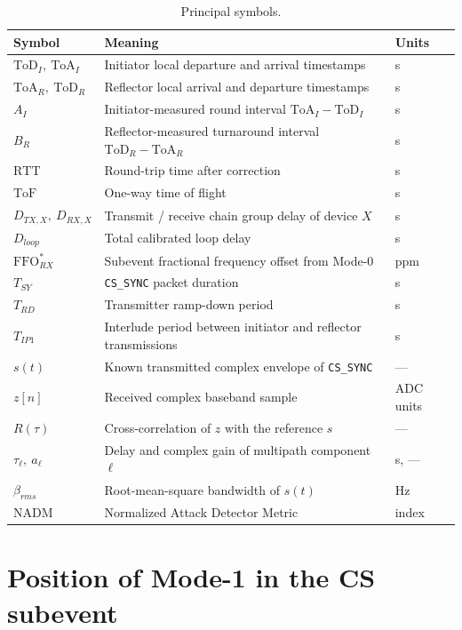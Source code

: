 \documentclass[11pt,a4paper]{article}
\newcommand{\ToD}{\mathrm{ToD}}
\newcommand{\ToA}{\mathrm{ToA}}
\newcommand{\ToF}{\mathrm{ToF}}
\newcommand{\RTT}{\mathrm{RTT}}
\newcommand{\FFO}{\mathrm{FFO}}
\newcommand{\NADM}{\mathrm{NADM}}
\newcommand{\Tsy}{T_{SY}}
\newcommand{\Trd}{T_{RD}}
\newcommand{\Tip}{T_{IP1}}
\newcommand{\code}[1]{\texttt{\small #1}}
\begin{document}
\begin{table}[h]
\caption{Principal symbols.}
\label{tab:symbols}
\centering\small
\begin{tabular}{@{}L{28mm}L{78mm}L{22mm}@{}}
\toprule
Symbol & Meaning & Units \\
\midrule
$\ToD_I,\ \ToA_I$ & Initiator local departure and arrival timestamps & s \\
$\ToA_R,\ \ToD_R$ & Reflector local arrival and departure timestamps & s \\
$A_I$ & Initiator-measured round interval $\ToA_I-\ToD_I$ & s \\
$B_R$ & Reflector-measured turnaround interval $\ToD_R-\ToA_R$ & s \\
$\RTT$ & Round-trip time after correction & s \\
$\ToF$ & One-way time of flight & s \\
$D_{TX,X},\ D_{RX,X}$ & Transmit / receive chain group delay of device $X$ & s \\
$D_{loop}$ & Total calibrated loop delay & s \\
$\FFO^{*}_{RX}$ & Subevent fractional frequency offset from Mode-0 & ppm \\
$\Tsy$ & \code{CS\_SYNC} packet duration & s \\
$\Trd$ & Transmitter ramp-down period & s \\
$\Tip$ & Interlude period between initiator and reflector transmissions & s \\
$s(t)$ & Known transmitted complex envelope of \code{CS\_SYNC} & --- \\
$z[n]$ & Received complex baseband sample & ADC units \\
$R(\tau)$ & Cross-correlation of $z$ with the reference $s$ & --- \\
$\tau_\ell,\ a_\ell$ & Delay and complex gain of multipath component $\ell$ & s, --- \\
$\beta_{rms}$ & Root-mean-square bandwidth of $s(t)$ & Hz \\
$\NADM$ & Normalized Attack Detector Metric & index \\
\bottomrule
\end{tabular}
\end{table}

\section{Position of Mode-1 in the CS subevent}
\end{document}
